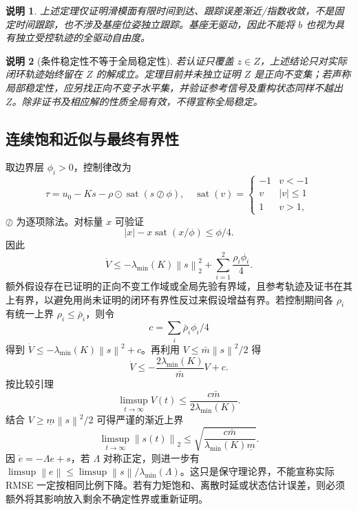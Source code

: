\documentclass[journal,onecolumn]{IEEEtran}
\newtheorem{remark}{说明}[section]
\newcommand{\norm}[1]{\left\lVert#1\right\rVert}
\newcommand{\sat}{\operatorname{sat}}
\begin{document}
\begin{remark}
上述定理仅证明\emph{滑模面有限时间到达}、跟踪误差\emph{渐近/指数}收敛，不是固定时间跟踪，也不涉及基座位姿独立跟踪。基座无驱动，因此不能将 $b$ 也视为具有独立受控轨迹的全驱动自由度。
\end{remark}

\begin{remark}[条件稳定性不等于全局稳定性]
若认证只覆盖 $z\in Z$，上述结论只对\emph{实际闭环轨迹始终留在 $Z$} 的解成立。定理目前并未独立证明 $Z$ 是正向不变集；若声称局部稳定性，应另找正向不变子水平集，并验证参考信号及重构状态同样不越出 $Z$。除非证书及相应解的性质全局有效，不得宣称全局稳定。
\end{remark}
\subsection{连续饱和近似与最终有界性}
取边界层 $\phi_i>0$，控制律改为
\begin{equation}
 \tau=u_0-Ks-\rho\odot\sat(s\oslash\phi),\quad
 \sat(v)=\begin{cases}-1&v<-1\\v&|v|\le1\\1&v>1,\end{cases}
\end{equation}
$\oslash$ 为逐项除法。对标量 $x$ 可验证
\begin{equation}
 |x|-x\sat(x/\phi)\le\phi/4.
\end{equation}
因此
\begin{equation}
 \dot V\le-\lambda_{\min}(K)\norm{s}_2^2+
 \sum_{i=1}^2\frac{\rho_i\phi_i}{4}.
 \label{eq:ultimate}
\end{equation}
额外假设存在已证明的正向不变工作域或全局先验有界域，且参考轨迹及证书在其上有界，以避免用尚未证明的闭环有界性反过来假设增益有界。若控制期间各 $\rho_i$ 有统一上界 $\rho_i\le\bar\rho_i$，则令
\begin{equation}
 c=\sum_i\bar\rho_i\phi_i/4
\end{equation}
得到 $\dot V\le-\lambda_{\min}(K)\norm{s}^2+c$。再利用 $V\le\bar m\norm{s}^2/2$ 得
\begin{equation}
 \dot V\le-\frac{2\lambda_{\min}(K)}{\bar m}V+c.
\end{equation}
按比较引理
\begin{equation}
 \limsup_{t\to\infty}V(t)\le\frac{c\bar m}{2\lambda_{\min}(K)}.
\end{equation}
结合 $V\ge\underline m\norm{s}^2/2$ 可得严谨的渐近上界
\begin{equation}
 \boxed{\limsup_{t\to\infty}\norm{s(t)}_2\le
 \sqrt{\frac{c\bar m}{\lambda_{\min}(K)\underline m}}.}
 \label{eq:sbound}
\end{equation}
因 $\dot e=-\Lambda e+s$，若 $\Lambda$ 对称正定，则进一步有 $\limsup\norm e\le\limsup\norm{s}/\lambda_{\min}(\Lambda)$。这只是保守理论界，不能宣称实际 RMSE 一定按相同比例下降。若有力矩饱和、离散时延或状态估计误差，则必须额外将其影响放入剩余不确定性界或重新证明。
\end{document}
